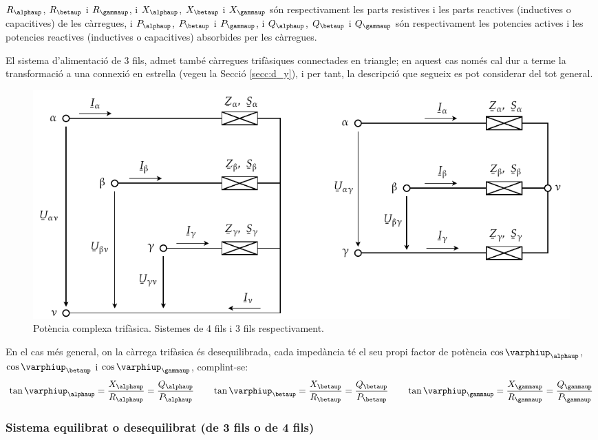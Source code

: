 $R_\alphaup$, $R_\betaup$ i $R_\gammaup$, i $X_\alphaup$, $X_\betaup$ i
$X_\gammaup$ s\'{o}n respectivament les parts resistives i les parts
reactives (inductives o capacitives) de les c\`{a}rregues, i $P_\alphaup$,
$P_\betaup$ i $P_\gammaup$, i $Q_\alphaup$, $Q_\betaup$ i $Q_\gammaup$ s\'{o}n
respectivament les potencies actives i les potencies reactives
(inductives o capacitives) absorbides per les c\`{a}rregues.

El sistema d'alimentaci\'{o} de 3 fils, admet tamb\'{e} c\`{a}rregues
trif\`{a}siques connectades en triangle; en aquest cas nom\'{e}s cal dur a
terme la transformaci\'{o} a una connexi\'{o} en estrella (vegeu la Secci\'{o}
\ref{secc:d_y}), i per tant, la descripci\'{o} que segueix es pot
considerar del tot general.

\begin{figure}[h]
\centering
    \includegraphics{Imatges/Cap-Fonaments-Potencia-Trif.pdf}
\caption{Pot\`{e}ncia complexa trif\`{a}sica. Sistemes de 4 fils i 3 fils
respectivament.} \label{pic:pot_comp_trif}
\end{figure}

En el cas m\'{e}s general, on la c\`{a}rrega trif\`{a}sica \'{e}s desequilibrada,
cada imped\`{a}ncia t\'{e} el seu propi factor de pot\`{e}ncia
$\cos\varphiup_\alphaup$, $\cos\varphiup_\betaup$ i $\cos\varphiup_\gammaup$,
complint-se:
\begin{equation}
    \tan\varphiup_\alphaup = \frac{X_\alphaup}{R_\alphaup} = \frac{Q_\alphaup}{P_\alphaup} \qquad
    \tan\varphiup_\betaup = \frac{X_\betaup}{R_\betaup} = \frac{Q_\betaup}{P_\betaup} \qquad
    \tan\varphiup_\gammaup = \frac{X_\gammaup}{R_\gammaup} = \frac{Q_\gammaup}{P_\gammaup}
\end{equation}

\subsubsection{Sistema equilibrat o desequilibrat (de 3 fils o de 4 fils)}


